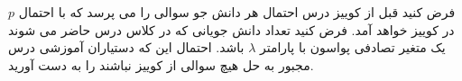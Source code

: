 \problem{}
فرض کنید قبل از کوییز درس احتمال هر دانش جو سوالی را می پرسد که با احتمال
 $p$
 در کوییز خواهد آمد.
فرض کنید تعداد دانش جویانی که در کلاس درس حاضر می شوند یک متغیر تصادفی پواسون با پارامتر
 $\lambda$
باشد. احتمال این که دستیاران آموزشی درس مجبور به حل هیچ سوالی از کوییز نباشند را به دست آورید.